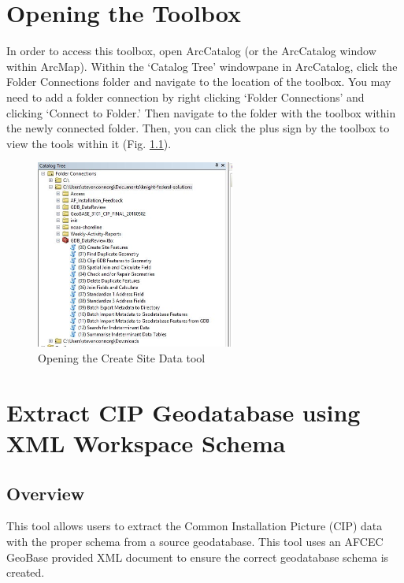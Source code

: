 \documentclass[openany]{book}
\theoremstyle{definition}
\theoremstyle{definition}
\theoremstyle{definition}
\theoremstyle{remark}
\begin{document}
\chapter{Opening the Toolbox}\label{opening-the-toolbox}

In order to access this toolbox, open ArcCatalog (or the ArcCatalog
window within ArcMap). Within the `Catalog Tree' windowpane in
ArcCatalog, click the Folder Connections folder and navigate to the
location of the toolbox. You may need to add a folder connection by
right clicking `Folder Connections' and clicking `Connect to Folder.'
Then navigate to the folder with the toolbox within the newly connected
folder. Then, you can click the plus sign by the toolbox to view the
tools within it (Fig. \ref{fig:opentoolbox}).

\begin{figure}[H]

{\centering \includegraphics[width=2.57in,]{figures/opentoolbox} 

}

\caption{Opening the Create Site Data tool}\label{fig:opentoolbox}
\end{figure}

\pagebreak
\printindex

\chapter{Extract CIP Geodatabase using XML Workspace Schema}\label{xCIP}

\section{Overview}\label{overview}

This tool allows users to extract the Common Installation Picture (CIP)
data with the proper schema from a source geodatabase. This tool uses an
AFCEC GeoBase provided XML document to ensure the correct geodatabase
schema is created.
\end{document}
